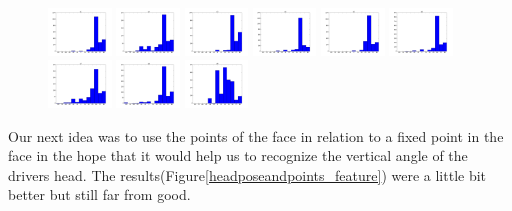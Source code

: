 \documentclass[10pt,twocolumn,letterpaper]{article}
\begin{document}
	\begin{figure}
	\includegraphics[width=0.15\textwidth]{headpose_evaluation_c1}
	\includegraphics[width=0.15\textwidth]{headpose_evaluation_c2}
	\includegraphics[width=0.15\textwidth]{headpose_evaluation_c3}
	\includegraphics[width=0.15\textwidth]{headpose_evaluation_c4}
	\includegraphics[width=0.15\textwidth]{headpose_evaluation_c5}
	\includegraphics[width=0.15\textwidth]{headpose_evaluation_c6}
	\includegraphics[width=0.15\textwidth]{headpose_evaluation_c7}\hspace{0.01\textwidth}
	\includegraphics[width=0.15\textwidth]{headpose_evaluation_c8}\hspace{0.009\textwidth}
	\includegraphics[width=0.15\textwidth]{headpose_evaluation_c9}
	\end{figure}
Our next idea was to use the points of the face in relation to a fixed point in the face in the hope that it would help us to recognize the vertical angle of the drivers head. The results(Figure\ref{headposeandpoints_feature}) were a little bit better but still far from good.
\end{document}
